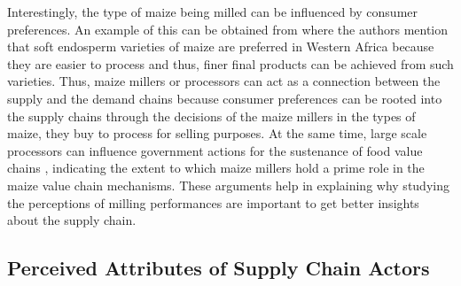 \documentclass[12pt,english]{article}\usepackage[]{graphicx}\usepackage[]{color}
\begin{document}
\begin{onehalfspace}
Interestingly, the type of maize being milled can be influenced by
consumer preferences. An example of this can be obtained from \citet{omueti2006comparison}
where the authors mention that soft endosperm varieties of maize are
preferred in Western Africa because they are easier to process and
thus, finer final products can be achieved from such varieties. Thus,
maize millers or processors can act as a connection between the supply
and the demand chains because consumer preferences can be rooted into
the supply chains through the decisions of the maize millers in the
types of maize, they buy to process for selling purposes. At the same
time, large scale processors can influence government actions for
the sustenance of food value chains \citep{omueti2006comparison},
indicating the extent to which maize millers hold a prime role in
the maize value chain mechanisms. These arguments help in explaining
why studying the perceptions of milling performances are important
to get better insights about the supply chain. 
\end{onehalfspace}
\begin{onehalfspace}

\subsection{Perceived Attributes of Supply Chain Actors\label{subsec:Perceived-Attributes}}
\end{onehalfspace}
\end{document}

